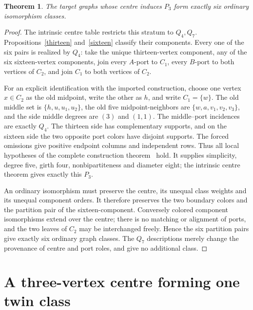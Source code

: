 \documentclass[11pt]{article}
\newtheorem{theorem}{Theorem}
\begin{document}
\begin{theorem}\label{sixpath}
The target graphs whose centre induces $P_3$ form exactly six ordinary
isomorphism classes.
\end{theorem}
\begin{proof}
The intrinsic centre table restricts this stratum to $Q_4,Q_7$.
Propositions~\ref{thirteen} and~\ref{sixteen} classify their components.
Every one of the six pairs is realized by $Q_4$: take the unique
thirteen-vertex component, any of the six sixteen-vertex components,
join every $A$-port to $C_1$, every $B$-port to both vertices of $C_2$,
and join $C_1$ to both vertices of $C_2$.

For an explicit identification with the imported construction, choose
one vertex $x\in C_2$ as the old midpoint, write the other as $h$, and
write $C_1=\{w\}$. The old middle set is
$\{h,u,u_1,u_2\}$, the old five midpoint-neighbors are
$\{w,a,v_1,v_2,v_3\}$, and the side middle degrees are $(3)$ and
$(1,1)$. The middle--port incidences are exactly $Q_4$. The thirteen
side has complementary supports, and on the sixteen side the two
opposite port colors have disjoint supports. The forced omissions
give positive endpoint columns and independent rows. Thus all local
hypotheses of the complete construction theorem~\cite{rows} hold.
It supplies simplicity, degree five, girth four, nonbipartiteness and
diameter eight; the intrinsic centre theorem gives exactly this $P_3$.

An ordinary isomorphism must preserve the centre, its unequal class
weights and its unequal component orders. It therefore preserves the
two boundary colors and the partition pair of the sixteen-component.
Conversely colored component isomorphisms extend over the centre;
there is no matching or alignment of ports, and the two leaves of
$C_2$ may be interchanged freely. Hence the six partition pairs give
exactly six ordinary graph classes. The $Q_7$ descriptions merely
change the provenance of centre and port roles, and give no additional
class.
\end{proof}

\section{A three-vertex centre forming one twin class}
\end{document}
